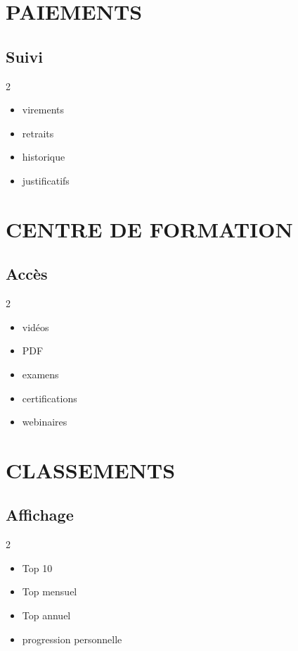 \documentclass[12pt,a4paper,oneside]{book}
\begin{document}
\chapter{PAIEMENTS}

\section{Suivi}
\begin{multicols}{2}
\begin{itemize}
\item virements
\item retraits
\item historique
\item justificatifs
\end{itemize}
\end{multicols}

\chapter{CENTRE DE FORMATION}

\section{Accès}
\begin{multicols}{2}
\begin{itemize}
\item vidéos
\item PDF
\item examens
\item certifications
\item webinaires
\end{itemize}
\end{multicols}

\chapter{CLASSEMENTS}

\section{Affichage}
\begin{multicols}{2}
\begin{itemize}
\item Top 10
\item Top mensuel
\item Top annuel
\item progression personnelle
\end{itemize}
\end{multicols}
\end{document}

